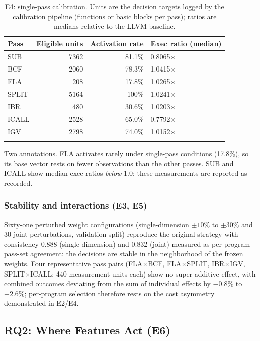 \documentclass[pdflatex,sn-mathphys-num]{sn-jnl}
\theoremstyle{thmstyleone}%
\theoremstyle{thmstyletwo}%
\theoremstyle{thmstylethree}%
\begin{document}
\begin{table}[!t]
\centering
\footnotesize
\caption{E4: single-pass calibration. Units are the decision targets logged by the
calibration pipeline (functions or basic blocks per pass); ratios are medians relative
to the LLVM baseline.}
\label{tab:e4_perpass}
\begin{tabular}{lrrl}
\toprule
Pass & Eligible units & Activation rate & Exec ratio (median) \\
\midrule
SUB & 7362 & 81.1\% & 0.8065$\times$ \\
BCF & 2060 & 78.3\% & 1.0415$\times$ \\
FLA & 208 & 17.8\% & 1.0265$\times$ \\
SPLIT & 5164 & 100\% & 1.0241$\times$ \\
IBR & 480 & 30.6\% & 1.0203$\times$ \\
ICALL & 2528 & 65.0\% & 0.7792$\times$ \\
IGV & 2798 & 74.0\% & 1.0152$\times$ \\
\botrule
\end{tabular}
\end{table}

Two annotations. FLA activates rarely under single-pass conditions (17.8\%), so
its base vector rests on fewer observations than the other passes. SUB and
ICALL show median exec ratios \emph{below} 1.0; these measurements are
reported as recorded.

\subsubsection{Stability and interactions (E3, E5)}
Sixty-one perturbed weight configurations (single-dimension $\pm10\%$ to $\pm30\%$ and
30 joint perturbations, validation split) reproduce the original strategy with
consistency 0.888 (single-dimension) and 0.832 (joint) measured as per-program
pass-set agreement: the decisions are stable in the neighborhood of the frozen
weights. Four representative pass pairs
(FLA$\times$BCF, FLA$\times$SPLIT, IBR$\times$IGV, SPLIT$\times$ICALL; 440
measurement units each) show no super-additive effect, with combined outcomes
deviating from the sum of individual effects by $-0.8\%$ to $-2.6\%$; per-program
selection therefore rests on the cost asymmetry demonstrated in E2/E4.

\subsection{RQ2: Where Features Act (E6)}
\label{sec:e6}
\end{document}
